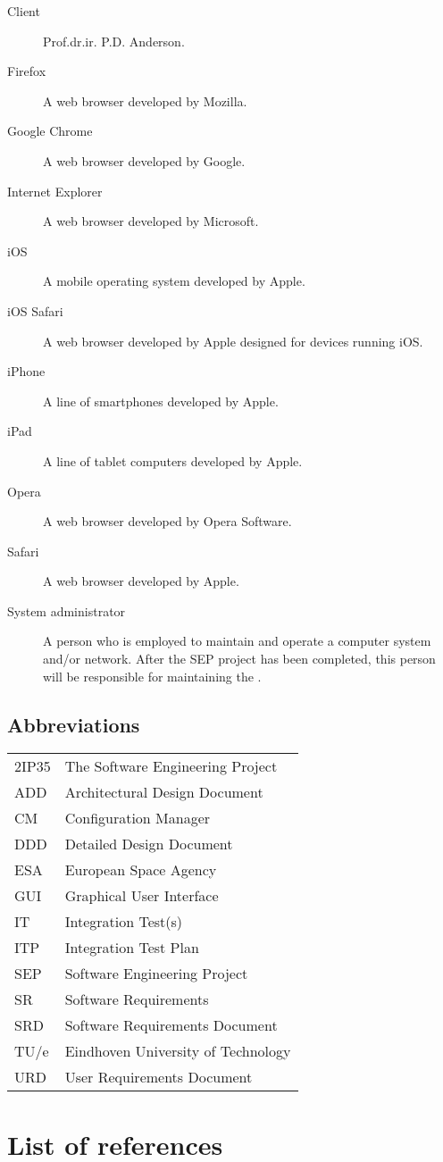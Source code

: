 \begin{description}
\item[Client] Prof.dr.ir. P.D. Anderson.
\item[Firefox] A web browser developed by Mozilla.
\item[Google Chrome] A web browser developed by Google.
\item[Internet Explorer] A web browser developed by Microsoft.
\item[iOS] A mobile operating system developed by Apple.
\item[iOS Safari] A web browser developed by Apple designed for devices running iOS.
\item[iPhone] A line of smartphones developed by Apple.
\item[iPad] A line of tablet computers developed by Apple.
\item[Opera] A web browser developed by Opera Software.
\item[Safari] A web browser developed by Apple.
\item[System administrator] A person who is employed to maintain and operate a computer system and/or network. After the SEP project has been completed, this person will be responsible for maintaining the \applicationname{}.
\end{description}


\subsection{Abbreviations}
\label{subsec:abbrev}
\begin{tabular}{l|l}
2IP35 & The Software Engineering Project \\
ADD & Architectural Design Document \\
CM    & Configuration Manager \\
DDD & Detailed Design Document \\
ESA & European Space Agency \\
GUI & Graphical User Interface \\
IT & Integration Test(s) \\
ITP & Integration Test Plan \\
SEP   & Software Engineering Project \\
SR    & Software Requirements \\
SRD   & Software Requirements Document \\
TU/e  & Eindhoven University of Technology \\
URD   & User Requirements Document \\
\end{tabular}


\section{List of references}
